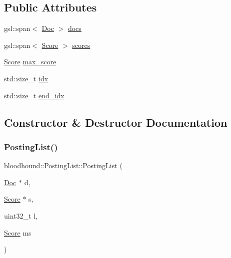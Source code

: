 \subsection*{Public Attributes}
\begin{DoxyCompactItemize}
\item 
gsl\+::span$<$ \mbox{\hyperlink{structbloodhound_1_1Doc}{Doc}} $>$ \mbox{\hyperlink{classbloodhound_1_1PostingList_a11749c12634d86c73b7d9c150acaac03}{docs}}
\item 
gsl\+::span$<$ \mbox{\hyperlink{structbloodhound_1_1Score}{Score}} $>$ \mbox{\hyperlink{classbloodhound_1_1PostingList_a2c773bffa3d78d2e7a7e04d918b064da}{scores}}
\item 
\mbox{\hyperlink{structbloodhound_1_1Score}{Score}} \mbox{\hyperlink{classbloodhound_1_1PostingList_ab840a6f9ddf8de353cbdd09b3a184bfa}{max\+\_\+score}}
\item 
std\+::size\+\_\+t \mbox{\hyperlink{classbloodhound_1_1PostingList_a9aa9a9d1db46c6858fa952a36e1bf8fa}{idx}}
\item 
std\+::size\+\_\+t \mbox{\hyperlink{classbloodhound_1_1PostingList_a7c4d53dfa824951670d68ef57cd2068d}{end\+\_\+idx}}
\end{DoxyCompactItemize}


\subsection{Constructor \& Destructor Documentation}
\mbox{\label{classbloodhound_1_1PostingList_a725f1df76c8278f1d927fff3ed4c496e}} 
\subsubsection{\texorpdfstring{Posting\+List()}{PostingList()}}
{\footnotesize\ttfamily bloodhound\+::\+Posting\+List\+::\+Posting\+List (\begin{DoxyParamCaption}\item[{\mbox{\hyperlink{structbloodhound_1_1Doc}{Doc}} $\ast$}]{d,  }\item[{\mbox{\hyperlink{structbloodhound_1_1Score}{Score}} $\ast$}]{s,  }\item[{uint32\+\_\+t}]{l,  }\item[{\mbox{\hyperlink{structbloodhound_1_1Score}{Score}}}]{ms }\end{DoxyParamCaption})\hspace{0.3cm}{\ttfamily [inline]}}



